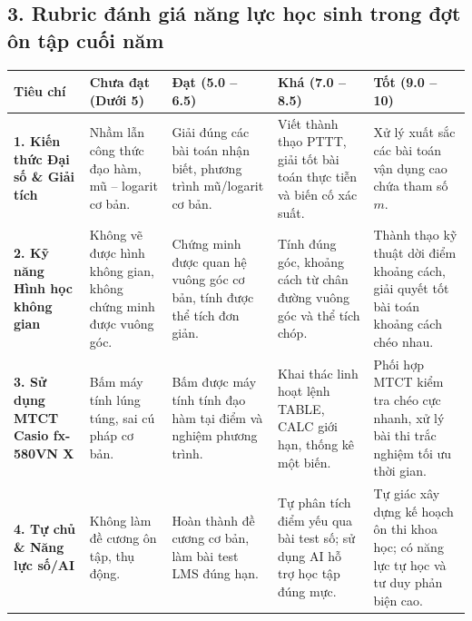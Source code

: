 \documentclass[12pt, a4paper]{article}
\begin{document}
\vspace{5pt}

\subsection*{3. Rubric đánh giá năng lực học sinh trong đợt ôn tập cuối năm}

\begin{center}
\begin{tabularx}{\textwidth}{|p{3cm}|X|X|X|X|}
\hline
\textbf{Tiêu chí} & \textbf{Chưa đạt (Dưới 5)} & \textbf{Đạt (5.0 -- 6.5)} & \textbf{Khá (7.0 -- 8.5)} & \textbf{Tốt (9.0 -- 10)} \\
\hline
\textbf{1. Kiến thức Đại số \& Giải tích} & Nhầm lẫn công thức đạo hàm, mũ -- logarit cơ bản. & Giải đúng các bài toán nhận biết, phương trình mũ/logarit cơ bản. & Viết thành thạo PTTT, giải tốt bài toán thực tiễn và biến cố xác suất. & Xử lý xuất sắc các bài toán vận dụng cao chứa tham số $m$. \\
\hline
\textbf{2. Kỹ năng Hình học không gian} & Không vẽ được hình không gian, không chứng minh được vuông góc. & Chứng minh được quan hệ vuông góc cơ bản, tính được thể tích đơn giản. & Tính đúng góc, khoảng cách từ chân đường vuông góc và thể tích chóp. & Thành thạo kỹ thuật dời điểm khoảng cách, giải quyết tốt bài toán khoảng cách chéo nhau. \\
\hline
\textbf{3. Sử dụng MTCT Casio fx-580VN X} & Bấm máy tính lúng túng, sai cú pháp cơ bản. & Bấm được máy tính tính đạo hàm tại điểm và nghiệm phương trình. & Khai thác linh hoạt lệnh TABLE, CALC giới hạn, thống kê một biến. & Phối hợp MTCT kiểm tra chéo cực nhanh, xử lý bài thi trắc nghiệm tối ưu thời gian. \\
\hline
\textbf{4. Tự chủ \& Năng lực số/AI} & Không làm đề cương ôn tập, thụ động. & Hoàn thành đề cương cơ bản, làm bài test LMS đúng hạn. & Tự phân tích điểm yếu qua bài test số; sử dụng AI hỗ trợ học tập đúng mực. & Tự giác xây dựng kế hoạch ôn thi khoa học; có năng lực tự học và tư duy phản biện cao. \\
\hline
\end{tabularx}
\end{center}
\end{document}
